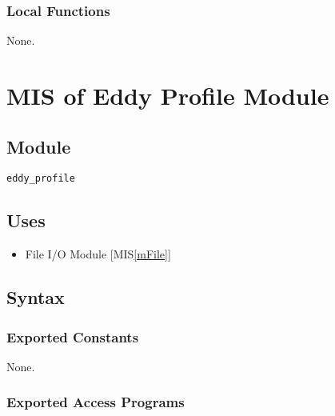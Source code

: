 \documentclass[12pt, titlepage]{article}
\begin{document}


\subsubsection{Local Functions}


None.

\newpage
\section{MIS of Eddy Profile Module} \label{mProf} 

\subsection{Module}
\texttt{eddy\_profile}

\subsection{Uses}
\begin{itemize}
\item File I/O Module [MIS\ref{mFile}]
\end{itemize}

\subsection{Syntax}

\subsubsection{Exported Constants}
None.

\subsubsection{Exported Access Programs}
\end{document}
